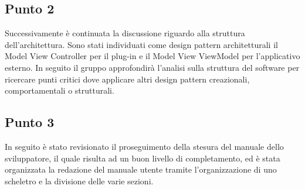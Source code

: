     \subsection{Punto 2}
        Successivamente è continuata la discussione riguardo alla struttura dell'architettura. Sono stati individuati come design pattern architetturali il Model View Controller per il plug-in e il Model View ViewModel per l'applicativo esterno. In seguito il gruppo approfondirà l'analisi sulla struttura del software per ricercare punti critici dove applicare altri design pattern creazionali, comportamentali o strutturali. 
    \subsection{Punto 3}
        In seguito è stato revisionato il proseguimento della stesura del manuale dello sviluppatore, il quale risulta ad un buon livello di completamento, ed è stata organizzata la redazione del manuale utente tramite l'organizzazione di uno scheletro e la divisione delle varie sezioni.